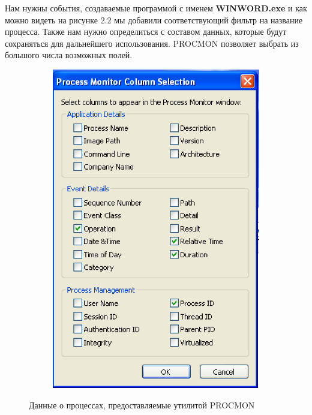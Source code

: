Нам нужны события, создаваемые программой с именем \textbf{WINWORD.exe} и как можно видеть на рисунке 2.2 мы добавили соответствующий фильтр на название процесса.
Также нам нужно определиться с составом данных, которые будут сохраняться для дальнейшего использования.
PROCMON позволяет выбрать из большого числа возможных полей.

\begin{figure}[ht]
	\centering
    \begin{subfigure}[b]{1\textwidth}
    \centering
        \includegraphics[scale=0.5]{procmon_columns.png}        
    \end{subfigure}
 
    \caption{Данные о процессах, предоставляемые утилитой PROCMON}
    \label{fig_parsetree}
\end{figure}

